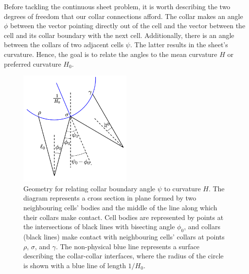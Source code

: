 
Before tackling the continuous sheet problem, it is worth describing the two degrees of freedom that our collar connections afford. 
The collar makes an angle $\phi$ between the vector pointing directly out of the cell and the vector between the cell and its collar boundary with the next cell. 
Additionally, there is an angle between the collars of two adjacent cells $\psi$. 
The latter results in the sheet's curvature. 
Hence, the goal is to relate the angles to the mean curvature $H$ or preferred curvature $H_0$.


\begin{figure}[htbp]
    \centering
    \includegraphics[width=0.5\textwidth]{hpsi.png}
    \caption[Geometry of sheet curvature]{Geometry for relating collar boundary angle $\psi$ to curvature $H$. The diagram represents a cross section in plane formed by two neighbouring cells' bodies and the middle of the line along which their collars make contact. Cell bodies are represented by points at the intersections of black lines with bisecting angle $\phi_0$, and collars (black lines) make contact with neighbouring cells' collars at points $\rho$, $\sigma$, and $\gamma$. The non-physical blue line represents a surface describing the collar-collar interfaces, where the radius of the circle is shown with a blue line of length $1/H_0$.}
    \label{fig:hpsi}
\end{figure}

